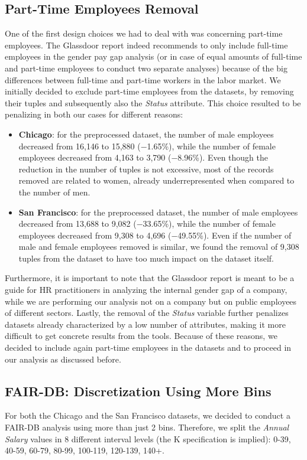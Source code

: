 \subsection{Part-Time Employees Removal}
\label{section:part-time_employees_removal}
One of the first design choices we had to deal with was concerning part-time employees. The Glassdoor report \cite{chamberlain2017analyze} indeed recommends to only include full-time employees in the gender pay gap analysis (or in case of equal amounts of full-time and part-time employees to conduct two separate analyses) because of the big differences between full-time and part-time workers in the labor market. We initially decided to exclude part-time employees from the datasets, by removing their tuples and subsequently also the \textit{Status} attribute. This choice resulted to be penalizing in both our cases for different reasons:
\begin{itemize}
\item \textbf{Chicago}: for the preprocessed dataset, the number of male employees decreased from 16,146 to 15,880 (\(-\)1.65\%), while the number of female employees decreased from 4,163 to 3,790 (\(-\)8.96\%). Even though the reduction in the number of tuples is not excessive, most of the records removed are related to women, already underrepresented when compared to the number of men.
\item \textbf{San Francisco}: for the preprocessed dataset, the number of male employees decreased from 13,688 to 9,082 (\(-\)33.65\%), while the number of female employees decreased from 9,308 to 4,696 (\(-\)49.55\%). Even if the number of male and female employees removed is similar, we found the removal of 9,308 tuples from the dataset to have too much impact on the dataset itself.
\end{itemize}
Furthermore, it is important to note that the Glassdoor report is meant to be a guide for HR practitioners in analyzing the internal gender gap of a company, while we are performing our analysis not on a company but on public employees of different sectors. Lastly, the removal of the \textit{Status} variable further penalizes datasets already characterized by a low number of attributes, making it more difficult to get concrete results from the tools. Because of these reasons, we decided to include again part-time employees in the datasets and to proceed in our analysis as discussed before.


\subsection{FAIR-DB: Discretization Using More Bins}
\label{section:fair-db_discretization_8_bins}
For both the Chicago and the San Francisco datasets, we decided to conduct a FAIR-DB analysis using more than just 2 bins. Therefore, we split the \textit{Annual Salary} values in 8 different interval levels (the K specification is implied): 0-39, 40-59, 60-79, 80-99, 100-119, 120-139, 140+.

